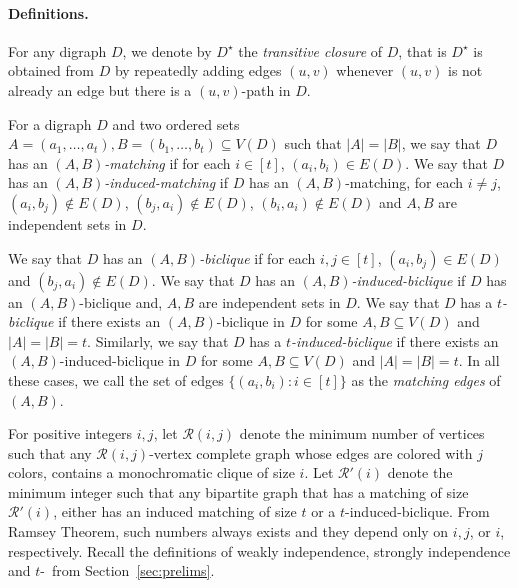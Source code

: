 \paragraph*{Definitions.}

 For any digraph $D$, we denote by $D^{\star}$ the {\em transitive closure} of $D$, that is $D^{\star}$ is obtained from $D$ by repeatedly adding edges $(u,v)$ whenever $(u,v)$ is not already an edge but there is a $(u,v)$-path in $D$.

For a digraph $D$ and two ordered sets $A =(a_1,\ldots, a_t),B=(b_1, \ldots,b_t) \subseteq V(D)$ such that $|A|=|B|$, we say that $D$ has an {\em $(A,B)$-matching} if for each $i \in [t]$, $(a_i,b_i) \in E(D)$. We say that $D$ has an {\em $(A,B)$-induced-matching} if $D$ has an $(A,B)$-matching, for each $i \neq j$, $(a_i,b_j) \not \in E(D)$, $(b_j,a_i) \not \in E(D)$, $(b_i,a_i) \not \in E(D)$ and $A,B$  are independent sets in $D$.

We say that $D$ has an {\em $(A,B)$-biclique} if for each $i,j \in [t]$, $(a_i,b_j) \in E(D)$ and $(b_j,a_i) \not \in E(D)$. We say that $D$ has an {\em $(A,B)$-induced-biclique}
if $D$ has an $(A,B)$-biclique and, $A, B$ are independent sets in $D$. We say that $D$ has a {\em $t$-biclique} if there exists an $(A,B)$-biclique in $D$ for some $A,B \subseteq V(D)$ and $|A|=|B|=t$. Similarly, we say that $D$ has a {\em $t$-induced-biclique} if there exists an $(A,B)$-induced-biclique in $D$ for some $A,B \subseteq V(D)$ and $|A|=|B|=t$. In all these cases, we call the set of edges $\{(a_i,b_i): i \in [t]\}$ as the {\em matching edges} of $(A,B)$.

For positive integers $i,j$, let $\mathcal{R}(i,j)$ denote the minimum number of vertices such that any $\mathcal{R}(i,j)$-vertex complete graph whose edges are colored with $j$ colors, contains a monochromatic clique of size $i$. Let $\mathcal{R}'(i)$ denote the minimum integer such that any bipartite graph that has a matching of size $\mathcal{R}'(i)$, either has an induced matching of size $t$ or a $t$-induced-biclique.
From Ramsey Theorem, such numbers always exists and they depend only on $i,j$, or $i$, respectively.
Recall the definitions of weakly independence, strongly independence and $t$-\toughpair\ from Section~\ref{sec:prelims}.

